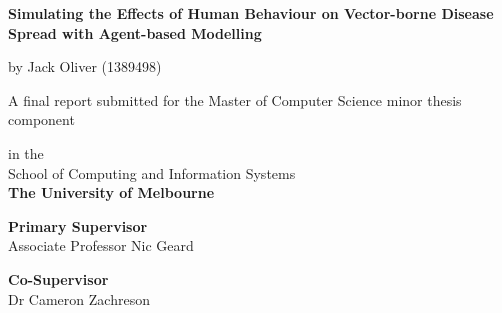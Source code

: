 \documentclass[a4paper, titlepage, 12pt]{article}
\newcommand{\thesisTitle}{Simulating the Effects of Human Behaviour on Vector-borne Disease Spread with Agent-based Modelling}
\newcommand{\name}{Jack Oliver}
\newcommand{\timeFrame}{School of Computing and Information Systems}
\newcommand{\school}{The University of Melbourne}
\newcommand{\supervisor}{Associate Professor Nic Geard}
\newcommand{\advisor}{Dr Cameron Zachreson}
\begin{document}
\begin{singlespace} %
\begin{titlepage}
\begin{center}
\vspace*{1.5cm}

\Large{\textbf{\thesisTitle}}
\vspace{2.5cm}

\large{by \name { }(1389498)} \\
\vspace{2cm}

\large{A final report submitted for the Master of Computer Science minor thesis component \\}
\vspace{.5cm}

\large{in the} \\
\large{\timeFrame} \\ 
\large{\textbf{\school}}
\vspace{2cm}

\large{\textbf{Primary Supervisor}}\\
\supervisor\\
\vspace{1.5cm}

\textbf{Co-Supervisor}\\
\advisor\\
\end{center}
\end{titlepage}
\end{singlespace}



\clearpage

\begin{spacing}{1.25} %
    \tableofcontents
\end{spacing}
\clearpage

{
\footnotesize
\listoftables
}
\clearpage

{
\footnotesize
\listoffigures
}
\clearpage




\clearpage
\end{document}
